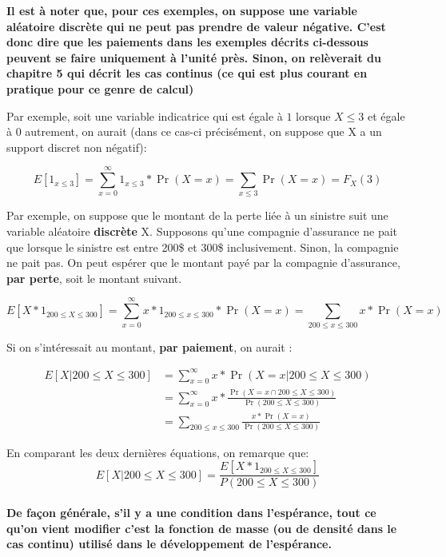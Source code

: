 \documentclass[10pt, french]{article}
\begin{document}
\begin{multicols*}{2}
\textbf{Il est à noter que, pour ces exemples, on suppose une variable aléatoire discrète qui ne peut pas prendre de valeur négative. C'est donc dire que les paiements dans les exemples décrits ci-dessous peuvent se faire uniquement à l'unité près. Sinon, on relèverait du chapitre 5 qui décrit les cas continus (ce qui est plus courant en pratique pour ce genre de calcul)}

\begin{definitionNOHFILLprop}
Par exemple, soit une variable indicatrice qui est égale à $1$ lorsque $X \leq 3$ et égale à $0$ autrement, on aurait (dans ce cas-ci précisément, on suppose que X a un support discret non négatif):

$$E[1_{x \leq 3}] =  \sum_{x=0}^\infty 1_{x \leq 3} * \Pr(X = x) = \sum_{x \leq 3} \Pr(X = x) = F_X (3)$$

\end{definitionNOHFILLprop}

\begin{definitionNOHFILLprop}
Par exemple, on suppose que le montant de la perte liée à un sinistre suit une variable aléatoire \textbf{discrète} X. Supposons qu'une compagnie d'assurance ne pait que lorsque le sinistre est entre 200\$ et 300\$ inclusivement. Sinon, la compagnie ne pait pas. On peut espérer que le montant payé par la compagnie d'assurance, \textbf{par perte}, soit le montant suivant.

$$E[X* 1_{200 \leq X \leq 300}] =  \sum_{x=0}^\infty x*1_{200 \leq x \leq 300} * \Pr(X = x) = \sum_{200 \leq x \leq 300} x*\Pr(X = x)$$

Si on s'intéressait au montant, \textbf{par paiement}, on aurait :

 \begin{align*}
  E[X|200 \leq X \leq 300]&= \sum_{x=0}^\infty  x * \Pr(X = x | 200 \leq X \leq 300) 
  \\&= \sum_{x=0}^\infty x * \frac{\Pr(X = x \cap 200 \leq X \leq 300)}{\Pr(200 \leq X \leq 300)} 
  \\&= \sum_{200 \leq x \leq 300} \frac{x*\Pr(X = x)}{\Pr(200 \leq X \leq 300)} 
  \end{align*}

En comparant les deux dernières équations, on remarque que:
$$E[X|200 \leq X \leq 300] = \frac{E[X* 1_{200 \leq X \leq 300}]}{P(200 \leq X \leq 300)}$$\\

\textbf{De façon générale, s'il y a une condition dans l'espérance, tout ce qu'on vient modifier c'est la fonction de masse (ou de densité dans le cas continu) utilisé dans le développement de l'espérance.}


\end{definitionNOHFILLprop}
\end{multicols*}
\end{document}
